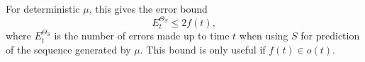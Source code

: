 \documentclass[a4paper]{article}
\def\X{\mathcal{X}}
\begin{document}
For deterministic $\mu$,
this gives the error bound~\cite[Thm.\ 3.36]{Hutter:2005}
\[
E_t^{\Theta_S} \leq 2f(t),
\]
where $E_t^{\Theta_S}$ is the number of errors made up to time $t$
when using $S$ for prediction of the sequence generated by $\mu$.
This bound is only useful if $f(t) \in o(t)$.








\end{document}
